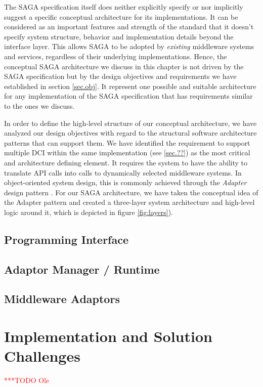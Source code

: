 \documentclass[a4paper,12pt]{article}
\newcommand{\todo}[1]{     {\textcolor{red}  { ***TODO      #1 }}}
\newcommand{\todo}[1]{}
\begin{document}
The SAGA specification itself does neither explicitly specify or nor implicitly
suggest a specific conceptual architecture for its implementations. It can be
considered as an important features and strength of the standard that it
doesn't specify system structure, behavior and implementation details beyond
the interface layer. This allows SAGA to be adopted by \textit{existing}
middleware systems and services, regardless of their underlying
implementations.  Hence, the conceptual SAGA architecture we discuss in this
chapter is not driven by the SAGA specification but by the design objectives
and requirements we have established in section \ref{sec.obj}. It
represent one possible and suitable architecture for any implementation of
the SAGA specification that has requirements similar to the ones we discuss. 

In order to define the high-level structure of our conceptual architecture, we
have analyzed our design objectives with regard to the structural software
architecture patterns that can support them. We have identified the requirement
to support multiple DCI within the same implementation (see \ref{sec.??}) as
the most critical and architecture defining element. It requires the system to
have the ability to translate API calls into calls to dynamically selected
middleware systems. In object-oriented system design, this is commonly achieved
through the \textit{Adapter} design pattern \cite{XXX}. For our SAGA
architecture, we have taken the conceptual idea of the Adapter pattern and
created a three-layer system architecture and high-level logic around it, which
is depicted in figure \ref{fig:layers}).


\subsection{Programming Interface}

\subsection{Adaptor Manager / Runtime}

\subsection{Middleware Adaptors}


% 
\section{Implementation and Solution Challenges}\todo{Ole}
\end{document}
